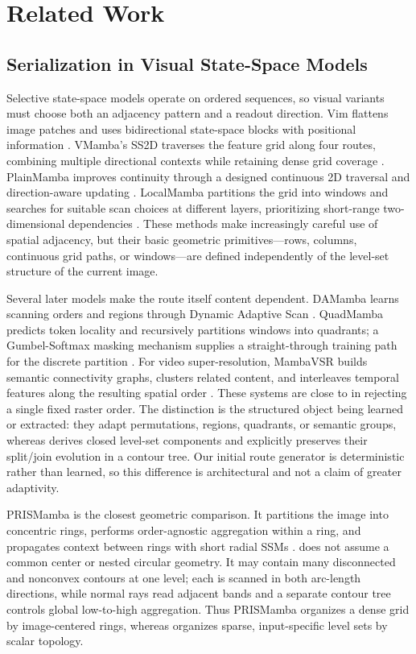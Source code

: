 \section{Related Work}

\subsection{Serialization in Visual State-Space Models}

Selective state-space models operate on ordered sequences, so visual variants must choose both an adjacency pattern and a readout direction. Vim flattens image patches and uses bidirectional state-space blocks with positional information \cite{zhu2024vim}. VMamba's SS2D traverses the feature grid along four routes, combining multiple directional contexts while retaining dense grid coverage \cite{liu2024vmamba}. PlainMamba improves continuity through a designed continuous 2D traversal and direction-aware updating \cite{yang2024plainmamba}. LocalMamba partitions the grid into windows and searches for suitable scan choices at different layers, prioritizing short-range two-dimensional dependencies \cite{huang2024localmamba}. These methods make increasingly careful use of spatial adjacency, but their basic geometric primitives---rows, columns, continuous grid paths, or windows---are defined independently of the level-set structure of the current image.

Several later models make the route itself content dependent. DAMamba learns scanning orders and regions through Dynamic Adaptive Scan \cite{li2025damamba}. QuadMamba predicts token locality and recursively partitions windows into quadrants; a Gumbel-Softmax masking mechanism supplies a straight-through training path for the discrete partition \cite{xie2024quadmamba}. For video super-resolution, MambaVSR builds semantic connectivity graphs, clusters related content, and interleaves temporal features along the resulting spatial order \cite{he2025mambavsr}. These systems are close to \method{} in rejecting a single fixed raster order. The distinction is the structured object being learned or extracted: they adapt permutations, regions, quadrants, or semantic groups, whereas \method{} derives closed level-set components and explicitly preserves their split/join evolution in a contour tree. Our initial route generator is deterministic rather than learned, so this difference is architectural and not a claim of greater adaptivity.

PRISMamba is the closest geometric comparison. It partitions the image into concentric rings, performs order-agnostic aggregation within a ring, and propagates context between rings with short radial SSMs \cite{hsieh2026prismamba}. \method{} does not assume a common center or nested circular geometry. It may contain many disconnected and nonconvex contours at one level; each is scanned in both arc-length directions, while normal rays read adjacent bands and a separate contour tree controls global low-to-high aggregation. Thus PRISMamba organizes a dense grid by image-centered rings, whereas \method{} organizes sparse, input-specific level sets by scalar topology.


